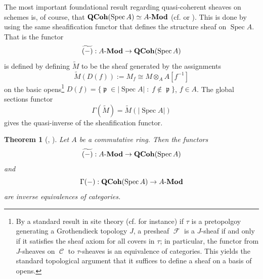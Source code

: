 \documentclass{amsart}
\newtheorem{Theorem}[equation]{Theorem}
\theoremstyle{definition}
\DeclareMathOperator{\Cscr}{\mathscr{C}}
\DeclareMathOperator{\Fscr}{\mathscr{F}}
\DeclareMathOperator{\pfrak}{\mathfrak{p}}
\DeclareMathOperator{\Spec}{Spec}
\DeclareMathOperator{\QCoh}{\mathbf{QCoh}}
\newcommand{\Mod}[1]{{#1}\textnormal{-}\mathbf{Mod}}
\numberwithin{equation}{subsection}
\begin{document}
The most important foundational result regarding quasi-coherent sheaves on schemes is, of course, that $\QCoh(\Spec A) \simeq \Mod{A}$ (cf.\@ \cite[Th{\'e}or{\`e}me 1.4.1]{EGA1} or \cite[Corollary II.5.5]{Hartshorne}). This is done by using the same sheafification functor that defines the structure sheaf on $\Spec A$. That is the functor
\begin{equation}\label{Eqn: Tilde functor for ring modules}
\widetilde{(-)}:\Mod{A} \to \QCoh(\Spec A)
\end{equation}
is defined by defining $\widetilde{M}$ to be the sheaf generated by the assignments
\[
\widetilde{M}(D(f)) := M_f \cong M \otimes_A A[f^{-1}]
\]
on the basic opens\footnote{By a standard result in site theory (cf.\@ \cite[Proposition III.4.1]{MacLaneMoerdijk} for instance) if $\tau$ is a pretopolgoy generating a Grothendieck topology $J$, a presheaf $\Fscr$ is a $J$-sheaf if and only if it satisfies the sheaf axiom for all covers in $\tau$; in particular, the functor from $J$-sheaves on $\Cscr$ to $\tau$-sheaves is an equivalence of categories. This yields the standard topological argument that it suffices to define a sheaf on a basis of opens.} $D(f) = \lbrace \pfrak \in \lvert \Spec A \rvert \; : \; f \notin \pfrak \rbrace$, $f \in A$. The global sections functor
\[
\Gamma(\widetilde{M}) = \widetilde{M}(\lvert \Spec A \rvert)
\]
gives the quasi-inverse of the sheafification functor.

\begin{Theorem}[{\cite[Th{\'e}or{\`e}me 1.4.1]{EGA1}, \cite[Corollary II.5.5]{Hartshorne}}]\label{Thm: Section Background Scheme: QCoh on affine is just modules}
Let $A$ be a commutative ring. Then the functors
\[
\widetilde{(-)}:\Mod{A} \to \QCoh(\Spec A)
\]
and
\[
\Gamma(-):\QCoh(\Spec A) \to \Mod{A}
\]
are inverse equivalences of categories.
\end{Theorem}
\end{document}
